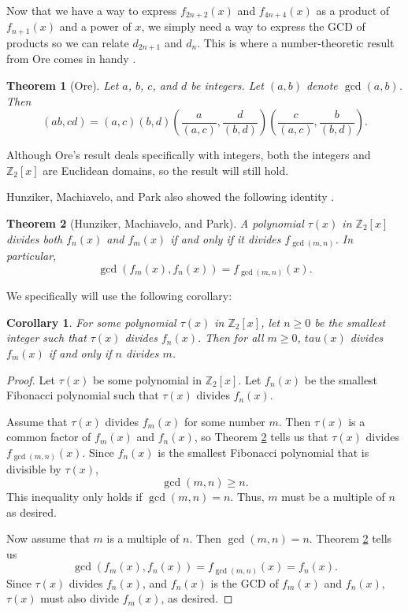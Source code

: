 \documentclass[a4paper]{article}
\newtheorem{theorem}{Theorem}[section]
\newtheorem{corollary}{Corollary}[theorem]
\newcommand{\Z}{\mathbb{Z}}
\begin{document}
	Now that we have a way to express $f_{2n+2}(x)$ and $f_{4n+4}(x)$ as a product of $f_{n+1}(x)$ and a power of $x$, we simply need a way to express the GCD of products so we can relate $d_{2n+1}$ and $d_n$.
	This is where a number-theoretic result from Ore comes in handy \cite{ore_number_theory}.
	
	\begin{theorem}[Ore]\label{Ore_gcd}
		Let $a$, $b$, $c$, and $d$ be integers.
		Let $(a,b)$ denote $\gcd{(a,b)}$.
		Then
		\begin{equation*}
			(ab,cd) = (a,c)(b,d)\left(\frac{a}{(a,c)},\frac{d}{(b,d)}\right)\left(\frac{c}{(a,c)},\frac{b}{(b,d)}\right).
		\end{equation*}
	\end{theorem}

	Although Ore's result deals specifically with integers, both the integers and $\Z_2[x]$ are Euclidean domains, so the result will still hold.
	
	Hunziker, Machiavelo, and Park also showed the following identity \cite{HUNZIKER2004465}.
	\begin{theorem}[Hunziker, Machiavelo, and Park]\label{HMP_gcd}
		A polynomial $\tau(x)$ in $\Z_2[x]$ divides both $f_n(x)$ and $f_m(x)$ if and only if it divides $f_{\gcd{(m,n)}}$.
		In particular,
		\begin{equation*}
			\gcd{\left(f_m(x), f_n(x)\right)} = f_{\gcd{(m,n)}}(x).
		\end{equation*}
	\end{theorem}

	We specifically will use the following corollary:
	\begin{corollary}\label{cor_HMP_gcd}
		For some polynomial $\tau(x)$ in $\Z_2[x]$, let $n \geq 0$ be the smallest integer such that $\tau(x)$ divides $f_n(x)$.
		Then for all $m \geq 0$, $tau(x)$ divides $f_m(x)$ if and only if $n$ divides $m$.
	\end{corollary}
	\begin{proof}
		Let $\tau(x)$ be some polynomial in $\Z_2[x]$.
		Let $f_n(x)$ be the smallest Fibonacci polynomial such that $\tau(x)$ divides $f_n(x)$.
		
		Assume that $\tau(x)$ divides $f_m(x)$ for some number $m$.
		Then $\tau(x)$ is a common factor of $f_m(x)$ and $f_n(x)$, so Theorem \ref{HMP_gcd} tells us that $\tau(x)$ divides $f_{\gcd{(m,n)}}(x)$.
		Since $f_n(x)$ is the smallest Fibonacci polynomial that is divisible by $\tau(x)$,
		\begin{equation*}
			\gcd{(m,n)} \geq n.
		\end{equation*}
		This inequality only holds if $\gcd{(m,n)} = n$.
		Thus, $m$ must be a multiple of $n$ as desired.
		
		Now assume that $m$ is a multiple of $n$.
		Then $\gcd{(m,n)} = n$.
		Theorem \ref{HMP_gcd} tells us
		\begin{equation*}
			\gcd{\left(f_m(x), f_n(x)\right)} = f_{\gcd{(m,n)}}(x) = f_n(x).
		\end{equation*}
		Since $\tau(x)$ divides $f_n(x)$, and $f_n(x)$ is the GCD of $f_m(x)$ and $f_n(x)$, $\tau(x)$ must also divide $f_m(x)$, as desired.
	\end{proof}
\end{document}
